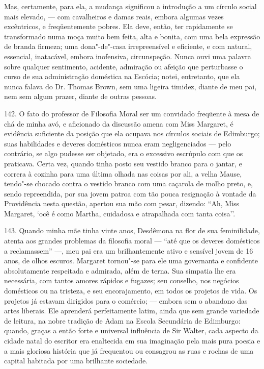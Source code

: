 Mas, certamente, para ela, a mudança significou a introdução a um
círculo social mais elevado, --- com cavalheiros e damas reais, embora
algumas vezes excêntricos, e freqüentemente pobres. Ela deve, então, ter
rapidamente se transformado numa moça muito bem feita, alta e bonita,
com uma bela expressão de branda firmeza; uma dona"-de"-casa
irrepreensível e eficiente, e com natural, essencial, inatacável, embora
inofensiva, circunspeção. Nunca ouvi uma palavra sobre qualquer
sentimento, acidente, admiração ou afeição que perturbasse o curso de
sua administração doméstica na Escócia; notei, entretanto, que ela nunca
falava do Dr. Thomas Brown, sem uma ligeira timidez, diante de meu pai,
nem sem algum prazer, diante de outras pessoas.

142. O fato do professor de Filosofia Moral ser um convidado freqüente à
mesa de chá de minha avó, e aficionado da discussão amena com Miss
Margaret, é evidência suficiente da posição que ela ocupava nos círculos
sociais de Edimburgo; suas habilidades e deveres domésticos nunca eram
negligenciados --- pelo contrário, se algo pudesse ser objetado, era o
excessivo escrúpulo com que os praticava. Certa vez, quando tinha posto
seu vestido branco para o jantar, e correra à cozinha para uma última
olhada nas coisas por ali, a velha Mause, tendo"-se chocado contra o
vestido branco com uma caçarola de molho preto, e, sendo repreendida,
por sua jovem patroa com tão pouca resignação à vontade da Providência
nesta questão, apertou sua mão com pesar, dizendo: ``Ah, Miss Margaret,
`ocê é como Martha, cuidadosa e atrapalhada com tanta coisa''.

143. Quando minha mãe tinha vinte anos, Desdêmona na flor de sua
feminilidade, atenta aos grandes problemas da filosofia moral --- ``até
que os deveres domésticos a reclamassem'' ---, meu pai era um
brilhantemente ativo e sensível jovem de 16 anos, de olhos escuros.
Margaret tornou"-se para ele uma governanta e confidente absolutamente
respeitada e admirada, além de terna. Sua simpatia lhe era necessária,
com tantos amores rápidos e fugazes; seu conselho, nos negócios
domésticos ou na tristeza, e seu encorajamento, em todos os projetos de
vida. Os projetos já estavam dirigidos para o comércio; --- embora sem o
abandono das artes liberais. Ele aprenderá perfeitamente latim, ainda
que sem grande variedade de leitura, na nobre tradição de Adam na Escola
Secundária de Edimburgo: quando, graças a então forte e universal
influência de Sir Walter, cada aspecto da cidade natal do escritor era
enaltecida em sua imaginação pela mais pura poesia e a mais gloriosa
história que já frequentou ou consagrou as ruas e rochas de uma capital
habitada por uma brilhante sociedade.

